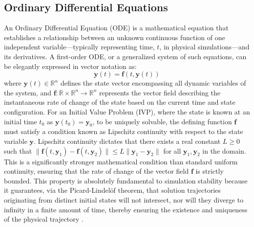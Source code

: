 \subsection{Ordinary Differential Equations}
An Ordinary Differential Equation (ODE) is a mathematical equation that establishes a relationship between an unknown continuous function of one independent variable—typically representing time, $t$, in physical simulations—and its derivatives. A first-order ODE, or a generalized system of such equations, can be elegantly expressed in vector notation as:
\begin{equation}
    \dot{\bm{y}}(t) = \bm{f}(t, \bm{y}(t))
\end{equation}
where $\bm{y}(t) \in \mathbb{R}^n$ defines the state vector encompassing all dynamic variables of the system, and $\bm{f}: \mathbb{R} \times \mathbb{R}^n \to \mathbb{R}^n$ represents the vector field describing the instantaneous rate of change of the state based on the current time and state configuration.
For an Initial Value Problem (IVP), where the state is known at an initial time $t_0$ as $\bm{y}(t_0) = \bm{y}_0$, to be uniquely solvable, the defining function $\bm{f}$ must satisfy a condition known as Lipschitz continuity with respect to the state variable $\bm{y}$. Lipschitz continuity dictates that there exists a real constant $L \ge 0$ such that $\|\bm{f}(t, \bm{y}_1) - \bm{f}(t, \bm{y}_2)\| \le L \|\bm{y}_1 - \bm{y}_2\|$ for all $\bm{y}_1, \bm{y}_2$ in the domain. This is a significantly stronger mathematical condition than standard uniform continuity, ensuring that the rate of change of the vector field $\bm{f}$ is strictly bounded. This property is absolutely fundamental to simulation stability because it guarantees, via the Picard-Lindelöf theorem, that solution trajectories originating from distinct initial states will not intersect, nor will they diverge to infinity in a finite amount of time, thereby ensuring the existence and uniqueness of the physical trajectory \cite{quarteroni2012calcolo}.

